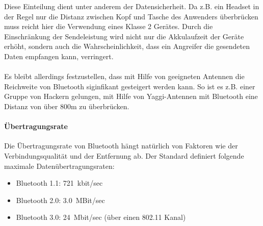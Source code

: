                 Diese Einteilung dient unter anderem der Datensicherheit. Da z.B. 
                ein Headset in der Regel nur die Distanz zwischen Kopf und Tasche
                des Anwenders überbrücken muss reicht hier die Verwendung eines Klasse 2
                Gerätes. Durch die Einschränkung der Sendeleistung wird nicht nur die
                Akkulaufzeit der Geräte erhöht, sondern auch die Wahrscheinlichkeit,
                dass ein Angreifer die gesendeten Daten empfangen kann, verringert.\\
                \\
                Es bleibt allerdings festzustellen, dass mit Hilfe von geeigneten
                Antennen die Reichweite von Bluetooth siginfikant gesteigert werden
                kann. So ist es z.B. einer Gruppe von Hackern gelungen, mit Hilfe von
                Yaggi-Antennen mit Bluetooth eine Distanz von über 800m zu überbrücken.
            \paragraph{Übertragungsrate}
                Die Übertragungsrate von Bluetooth hängt natürlich von Faktoren wie
                der Verbindungsqualität und der Entfernung ab. Der Standard definiert
                folgende maximale Datenübertragungsraten:

                \begin{itemize}
                    \item{Bluetooth 1.1:} 721~kbit/sec
                    \item{Bluetooth 2.0:} 3.0~MBit/sec
                    \item{Bluetooth 3.0:} 24~Mbit/sec (über einen 802.11 Kanal)
                \end{itemize}

